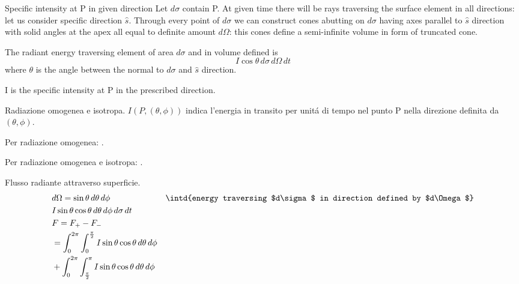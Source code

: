 \begin{definition}{Specific intensity at P in given direction}
Let $d\sigma$ contain P. At given time there will be rays traversing the surface element in all directions: let us consider specific direction $\hat{s}$. Through every point of $d\sigma$ we can construct cones abutting on $d\sigma$ having axes parallel to $\hat{s}$ direction with solid angles at the apex all equal to definite amount $d\Omega$: this cones define a semi-infinite volume in form of truncated cone.

The radiant energy traversing element of area $d\sigma$ and in volume defined is
\begin{equation*}
I\cos{\theta}\,d\sigma\,d\Omega\,dt
\end{equation*}
where $\theta$ is the angle between the normal to $d\sigma$ and $\hat{s}$ direction.

I is the specific intensity at P in the prescribed direction.
\end{definition}


\begin{definition}{Radiazione omogenea e isotropa.}
$I(P,(\theta,\phi))$ indica l'energia in transito per unit\'a di tempo nel punto P nella direzione definita da $(\theta,\phi)$.

Per radiazione omogenea: .

Per radiazione omogenea e isotropa: .
\end{definition}


\begin{definition}{Flusso radiante attraverso superficie.}
\begin{align*}
&d\Omega=\sin{\theta}\,d\theta\,d\phi&\intd{energy traversing $d\sigma$ in direction defined by $d\Omega$}\\
&I\sin{\theta}\cos{\theta}\,d\theta\,d\phi\,d\sigma\,dt\\
&F=F_+-F_-\\
&=\int_0^{2\pi}\int_0^{\frac{\pi}{2}}I\sin{\theta}\cos{\theta}\,d\theta\,d\phi\\
&+\int_0^{2\pi}\int_{\frac{\pi}{2}}^{\pi}I\sin{\theta}\cos{\theta}\,d\theta\,d\phi
\end{align*}
\end{definition}


